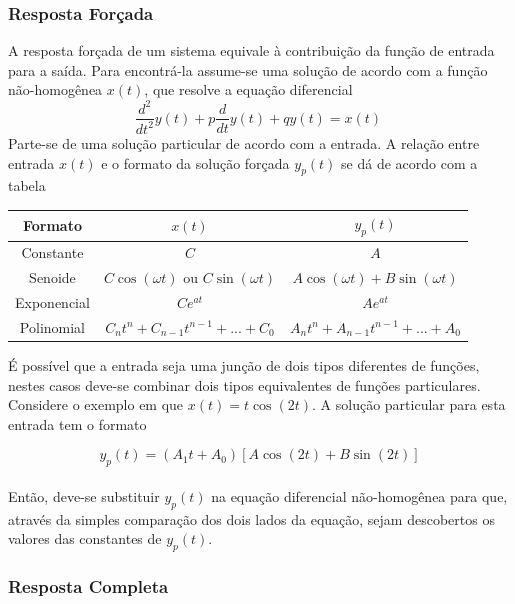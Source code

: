 \documentclass{article}
\numberwithin{equation}{section}
\begin{document}
    \subsubsection{Resposta Forçada}
    \label{subsubsec:forçada}
    A resposta forçada de um sistema equivale à contribuição da função de entrada para a saída. Para encontrá-la assume-se uma solução de acordo com a função não-homogênea $x(t)$, que resolve a equação diferencial
    \begin{equation*}
        \displaystyle\frac{d^2}{dt^2}y(t)+p\frac{d}{dt}y(t)+qy(t)=x(t)\
    \end{equation*}
    Parte-se de uma solução particular de acordo com a entrada. A relação entre entrada $x(t)$ e o formato da solução forçada $y_{p}(t)$ se dá de acordo com a tabela
    \begin{center}
            \begin{tabular}{|c|c|c|} \hline
            Formato & $x(t)$ & $y_{p}(t)$ \\ \hline
            Constante & $C$ & $A$ \\ \hline
            Senoide & $C\cos(\omega t)$ ou $C\sin(\omega t)$ & $A\cos(\omega t) + B\sin(\omega t)$ \\ \hline
            Exponencial & $Ce^{at}$ & $Ae^{at}$ \\ \hline
            Polinomial & $C_{n}t^{n} + C_{n-1}t^{n-1} + ... + C_{0}$ & $A_{n}t^{n} + A_{n-1}t^{n-1} + ... + A_{0}$ \\ \hline
        \end{tabular}
    \end{center}

    É possível que a entrada seja uma junção de dois tipos diferentes de funções, nestes casos deve-se combinar dois tipos equivalentes de funções particulares. Considere o exemplo em que $x(t) = t \cos(2t)$. A solução particular para esta entrada tem o formato

    \begin{equation*}
        y_{p}(t)=(A_{1}t+A_{0})[A\cos(2t)+B\sin(2t)]
    \end{equation*}
    \\
    Então, deve-se substituir $y_{p}(t)$ na equação diferencial não-homogênea para que, através da simples comparação dos dois lados da equação, sejam descobertos os valores das constantes de $y_{p}(t)$.

    \subsubsection{Resposta Completa}
    \label{subsubsec:completa}
\end{document}
